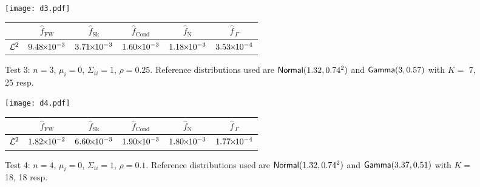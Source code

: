 \begin{figure}[H]
\centering
\texttt{[image: d3.pdf]}

\vspace{4mm}

\begin{tabular}{c|c|c|c|c|c|}
\cline{2-6}
                         & $\widehat{f}_{\mathrm{FW}}$  & $\widehat{f}_{\mathrm{Sk}}$ & $\widehat{f}_{\mathrm{Cond}}$ & $\widehat{f}_{\mathrm{N}}$  & $\widehat{f}_{\,\Gamma}$ \\ \hline
\multicolumn{1}{|c|}{$\mathcal{L}^2$} & $9.48 {\mkern-2mu\times\mkern-2mu} 10^{-3}$ & $3.71 {\mkern-2mu\times\mkern-2mu} 10^{-3}$ & $1.60 {\mkern-2mu\times\mkern-2mu} 10^{-3}$ & $1.18 {\mkern-2mu\times\mkern-2mu} 10^{-3}$ & $3.53 {\mkern-2mu\times\mkern-2mu} 10^{-4}$ \\ \hline
\end{tabular}
\caption*{Test 3: $n=3$, $\mu_i = 0$, $\Sigma_{ii} = 1$, $\rho = 0.25$. Reference distributions used are $\mathsf{Normal}(1.32,0.74^2)$ and $\mathsf{Gamma}(3,0.57)$ with $K =$ 7, 25 resp.}
\end{figure}



\begin{figure}[H]
\centering
\texttt{[image: d4.pdf]}

\vspace{4mm}

\begin{tabular}{c|c|c|c|c|c|}
\cline{2-6}
                         & $\widehat{f}_{\mathrm{FW}}$  & $\widehat{f}_{\mathrm{Sk}}$ & $\widehat{f}_{\mathrm{Cond}}$ & $\widehat{f}_{\mathrm{N}}$  & $\widehat{f}_{\,\Gamma}$ \\ \hline
\multicolumn{1}{|c|}{$\mathcal{L}^2$} & $1.82 {\mkern-2mu\times\mkern-2mu} 10^{-2}$ & $6.60 {\mkern-2mu\times\mkern-2mu} 10^{-3}$ & $1.90 {\mkern-2mu\times\mkern-2mu} 10^{-3}$ & $1.80 {\mkern-2mu\times\mkern-2mu} 10^{-3}$ & $1.77 {\mkern-2mu\times\mkern-2mu} 10^{-4}$ \\ \hline
\end{tabular}
\caption*{Test 4: $n=4$, $\mu_i = 0$, $\Sigma_{ii}=1$, $\rho = 0.1$. Reference distributions used are $\mathsf{Normal}(1.32,0.74^2)$ and $\mathsf{Gamma}(3.37,0.51)$ with $K =$ 18, 18 resp.}
\end{figure}



